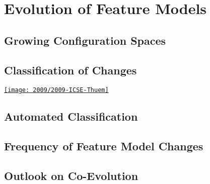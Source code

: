 \documentclass[
	aspectratio=169, %
	8pt, %
]{beamer}
\subtitle{12. Evolution and Maintenance}
\author{Timo Kehrer, Thomas Thüm}
\begin{document}



\section{Evolution of Feature Models}

\subsection{Growing Configuration Spaces}

\subsection{Classification of Changes}
\begin{frame}{\insertsubsection}
	\begin{mycolumns}
		\href{https://github.com/SoftVarE-Group/Papers/blob/main/2009/2009-ICSE-Thuem.pdf}{\texttt{[image: 2009/2009-ICSE-Thuem]}}
	\mynextcolumn
	\end{mycolumns}
\end{frame}


\subsection{Automated Classification}
\subsection{Frequency of Feature Model Changes}

\subsection{Outlook on Co-Evolution}
\end{document}
